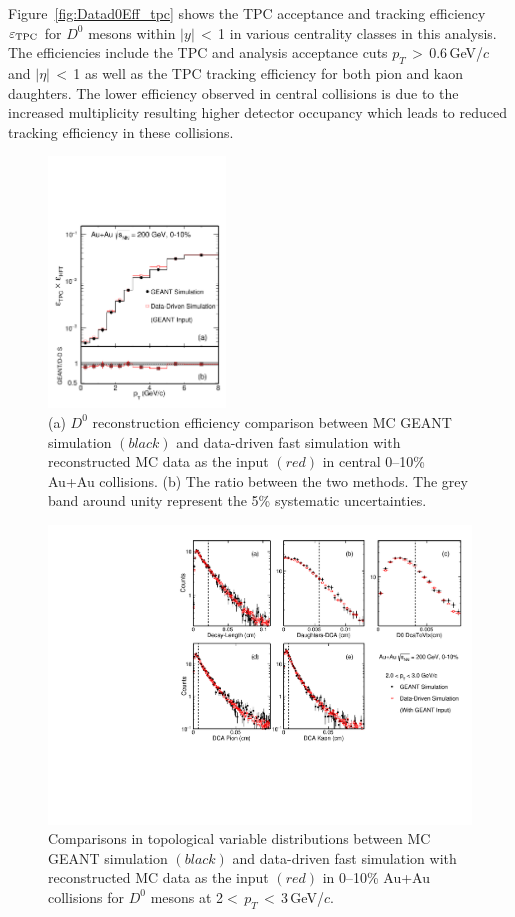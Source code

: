 \documentclass[%
 reprint,	
 amsmath,amssymb,
 aps,
 prc,
]{revtex4-1}
\begin{document}
Figure~\ref{fig:Datad0Eff_tpc} shows the TPC acceptance and tracking efficiency $\varepsilon_{\rm TPC}$ for $D^0$ mesons within $|y|$\,$<$\,1 in various centrality classes in this analysis. The efficiencies include the TPC and analysis acceptance cuts $p_{T}$\,$>$\,0.6\,GeV/$c$ and $|\eta|$\,$<$\,1 as well as the TPC tracking efficiency for both pion and kaon daughters. The lower efficiency observed in central collisions is due to the increased multiplicity resulting higher detector occupancy which leads to reduced tracking efficiency in these collisions.


\begin{figure}
\centering
\includegraphics[width=0.42\textwidth]{fig/Mcd0Eff_0_10.pdf}
  \caption{(a) $D^{0}$ reconstruction efficiency comparison between MC GEANT simulation $(black)$ and data-driven fast simulation with reconstructed MC data as the input $(red)$ in central 0--10\% Au+Au collisions. (b) The ratio between the two methods. The grey band around unity represent the 5\% systematic uncertainties.}
\label{fig:Mcd0Eff_0_10} 
\end{figure}


\begin{figure}
\centering
\includegraphics[width=1.0\textwidth]{fig/McTopo.pdf}
\caption{Comparisons in topological variable distributions between MC GEANT simulation $(black)$ and data-driven fast simulation with reconstructed MC data as the input $(red)$ in 0--10\% Au+Au collisions for $D^0$ mesons at 2$<$\,$p_T$\,$<$\,3\,GeV/$c$.}
\label{fig:McTopo} 
\end{figure}
\end{document}
